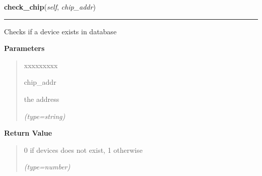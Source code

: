     \label{DBE:DBE:check_chip}

    \vspace{0.5ex}

\hspace{.8\funcindent}\begin{boxedminipage}{\funcwidth}

    \raggedright \textbf{check\_chip}(\textit{self}, \textit{chip\_addr})

    \vspace{-1.5ex}

    \rule{\textwidth}{0.5\fboxrule}
\setlength{\parskip}{2ex}
    Checks if a device exists in database

\setlength{\parskip}{1ex}
      \textbf{Parameters}
      \vspace{-1ex}

      \begin{quote}
        \begin{Ventry}{xxxxxxxxx}

          \item[chip\_addr]

          the address

            {\it (type=string)}

        \end{Ventry}

      \end{quote}

      \textbf{Return Value}
    \vspace{-1ex}

      \begin{quote}
      0 if devices does not exist, 1 otherwise

      {\it (type=number)}

      \end{quote}

    \end{boxedminipage}

    \label{DBE:DBE:check_status}

    \vspace{0.5ex}

